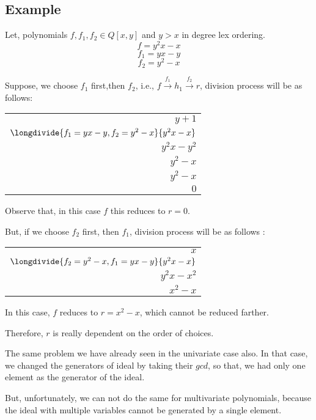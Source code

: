 \subsection{Example}
Let, polynomials $f,f_1,f_2 \in Q[x,y]$ and $y>x$ in degree lex ordering.
$$f = y^2x - x$$
$$f_1 = yx - y$$
$$f_2 = y^2 - x$$

Suppose, we choose $f_1$ first,then $f_2$, i.e., $f \mathop \rightarrow\limits^{f_1} h_1 \mathop \rightarrow\limits^{f_2} r$, division process will be as follows:



\begin{center}
\begin{tabular}{r}
	$y + 1 $ \hphantom{$\strut-x$} \\
	$\longdivide{f_1 = yx - y, f_2 = y^2 - x}{y^2x - x}$ \hphantom{$\strut-x$} \\
	{\underline{$y^2x - y^2$}}\hphantom{$\strut-x$}\\
	$y^2 - x$  \\
	\underline{$y^2 - x$} \\
	$0$
\end{tabular}
\end{center}

Observe that, in this case $f$ this reduces to $r = 0$.

But, if we choose $f_2$ first, then $f_1$, division process will be as follows :

\begin{center}
\begin{tabular}{r}
	$x $ \hphantom{$\strut-x$} \\
	$\longdivide{f_2 = y^2 - x, f_1 = yx - y}{y^2x - x}$ \hphantom{$\strut-x$} \\
	{\underline{$y^2x - x^2$}}\hphantom{$\strut-x$}\\
	$x^2 - x$
	
\end{tabular}
\end{center}

In this case, $f$ reduces to $ r = x^2 - x $, which cannot be reduced farther.

Therefore, $r$ is really dependent on the order of choices.

The same problem we have already seen in the univariate case also. In that case, we changed the generators of ideal by taking their $gcd$, so that, we had only one element as the generator of the ideal.

But, unfortunately, we can not do the same for multivariate polynomials, because the ideal with multiple variables cannot be generated by a single element.

